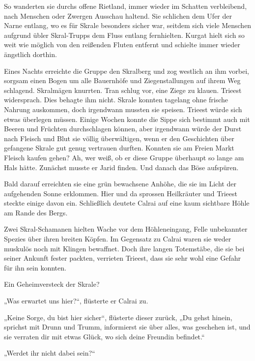 So wanderten sie durchs offene Rietland, immer wieder im Schatten verbleibend, nach Menschen oder Zwergen Ausschau haltend. Sie schlichen dem Ufer der Narne entlang, wo es für Skrale besonders sicher war, seitdem sich viele Menschen aufgrund übler Skral-Trupps dem Fluss entlang fernhielten. Kurgat hielt sich so weit wie möglich von den reißenden Fluten entfernt und schielte immer wieder ängstlich dorthin.\bigskip







Eines Nachts erreichte die Gruppe den Skralberg und zog westlich an ihm vorbei, sorgsam einen Bogen um alle Bauernhöfe und Ziegenstallungen auf ihrem Weg schlagend. Skralmägen knurrten. Tran schlug vor, eine Ziege zu klauen. Trieest widersprach. Dies behagte ihm nicht. Skrale konnten tagelang ohne frische Nahrung auskommen, doch irgendwann mussten sie speisen. Trieest würde sich etwas überlegen müssen. Einige Wochen konnte die Sippe sich bestimmt auch mit Beeren und Früchten durchschlagen können, aber irgendwann würde der Durst nach Fleisch und Blut sie völlig überwältigen, wenn er den Geschichten über gefangene Skrale gut genug vertrauen durften. Konnten sie am Freien Markt Fleisch kaufen gehen? Ah, wer weiß, ob er diese Gruppe überhaupt so lange am Hals hätte. Zunächst musste er Jarid finden. Und danach das Böse aufspüren.

Bald darauf erreichten sie eine grün bewachsene Anhöhe, die sie im Licht der aufgehenden Sonne erklommen. Hier und da sprossen Heilkräuter und Trieest steckte einige davon ein. Schließlich deutete Calrai auf eine kaum sichtbare Höhle am Rande des Bergs.

Zwei Skral-Schamanen hielten Wache vor dem Höhleneingang, Felle unbekannter Spezies über ihren breiten Köpfen. Im Gegensatz zu Calrai waren sie weder muskulös noch mit Klingen bewaffnet. Doch ihre langen Totemstäbe, die sie bei seiner Ankunft fester packten, verrieten Trieest, dass sie sehr wohl eine Gefahr für ihn sein konnten.

Ein Geheimversteck der Skrale?

„Was erwartet uns hier?“, flüsterte er Calrai zu.

„Keine Sorge, du bist hier sicher“, flüsterte dieser zurück, „Du gehst hinein, sprichst mit Drunn und Trumm, informierst sie über alles, was geschehen ist, und sie verraten dir mit etwas Glück, wo sich deine Freundin befindet.“

„Werdet ihr nicht dabei sein?“

